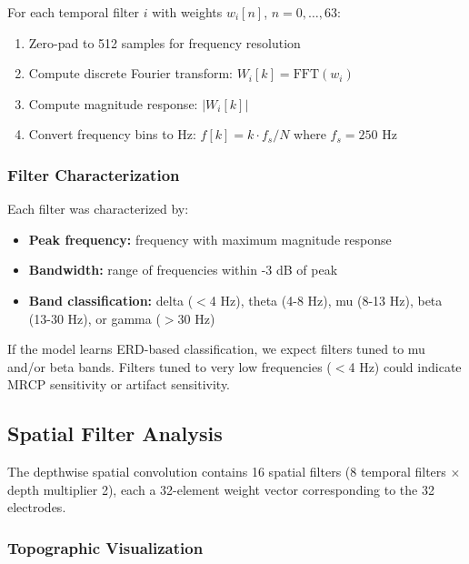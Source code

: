 For each temporal filter $i$ with weights $w_i[n]$, $n = 0, \ldots, 63$:

\begin{enumerate}
    \item Zero-pad to 512 samples for frequency resolution
    \item Compute discrete Fourier transform: $W_i[k] = \text{FFT}(w_i)$
    \item Compute magnitude response: $|W_i[k]|$
    \item Convert frequency bins to Hz: $f[k] = k \cdot f_s / N$ where $f_s = 250$ Hz
\end{enumerate}

\subsubsection{Filter Characterization}

Each filter was characterized by:

\begin{itemize}
    \item \textbf{Peak frequency:} frequency with maximum magnitude response
    \item \textbf{Bandwidth:} range of frequencies within -3 dB of peak
    \item \textbf{Band classification:} delta ($<$4 Hz), theta (4-8 Hz), mu (8-13 Hz), beta (13-30 Hz), or gamma ($>$30 Hz)
\end{itemize}

If the model learns ERD-based classification, we expect filters tuned to mu and/or beta bands. Filters tuned to very low frequencies ($<$4 Hz) could indicate MRCP sensitivity or artifact sensitivity.


\subsection{Spatial Filter Analysis}
\label{subsec:methods_spatial_filters}

The depthwise spatial convolution contains 16 spatial filters (8 temporal filters $\times$ depth multiplier 2), each a 32-element weight vector corresponding to the 32 electrodes.

\subsubsection{Topographic Visualization}

